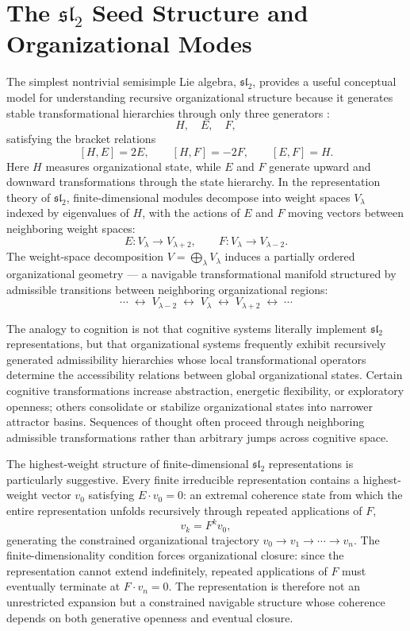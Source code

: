 \documentclass[12pt,a4paper]{report}
\theoremstyle{flyxion}
\begin{document}
\section{The \texorpdfstring{$\mathfrak{sl}_2$}{sl2} Seed Structure and Organizational Modes}

The simplest nontrivial semisimple Lie algebra, $\mathfrak{sl}_2$, provides a useful conceptual model for understanding recursive organizational structure because it generates stable transformational hierarchies through only three generators \cite{humphreys}:
\[
H, \quad E, \quad F,
\]
satisfying the bracket relations
\[
[H, E] = 2E, \qquad [H, F] = -2F, \qquad [E, F] = H.
\]
Here $H$ measures organizational state, while $E$ and $F$ generate upward and downward transformations through the state hierarchy. In the representation theory of $\mathfrak{sl}_2$, finite-dimensional modules decompose into weight spaces $V_\lambda$ indexed by eigenvalues of $H$, with the actions of $E$ and $F$ moving vectors between neighboring weight spaces:
\[
E : V_\lambda \rightarrow V_{\lambda+2}, \qquad F : V_\lambda \rightarrow V_{\lambda-2}.
\]
The weight-space decomposition $V = \bigoplus_\lambda V_\lambda$ induces a partially ordered organizational geometry --- a navigable transformational manifold structured by admissible transitions between neighboring organizational regions:
\[
\cdots \;\leftrightarrow\; V_{\lambda-2} \;\leftrightarrow\; V_\lambda \;\leftrightarrow\; V_{\lambda+2} \;\leftrightarrow\; \cdots
\]

The analogy to cognition is not that cognitive systems literally implement $\mathfrak{sl}_2$ representations, but that organizational systems frequently exhibit recursively generated admissibility hierarchies whose local transformational operators determine the accessibility relations between global organizational states. Certain cognitive transformations increase abstraction, energetic flexibility, or exploratory openness; others consolidate or stabilize organizational states into narrower attractor basins. Sequences of thought often proceed through neighboring admissible transformations rather than arbitrary jumps across cognitive space.

The highest-weight structure of finite-dimensional $\mathfrak{sl}_2$ representations is particularly suggestive. Every finite irreducible representation contains a highest-weight vector $v_0$ satisfying $E \cdot v_0 = 0$: an extremal coherence state from which the entire representation unfolds recursively through repeated applications of $F$,
\[
v_k = F^k v_0,
\]
generating the constrained organizational trajectory $v_0 \rightarrow v_1 \rightarrow \cdots \rightarrow v_n$. The finite-dimensionality condition forces organizational closure: since the representation cannot extend indefinitely, repeated applications of $F$ must eventually terminate at $F \cdot v_n = 0$. The representation is therefore not an unrestricted expansion but a constrained navigable structure whose coherence depends on both generative openness and eventual closure.
\end{document}
